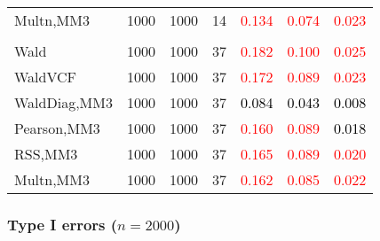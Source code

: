 \documentclass[
]{article}
\begin{document}
\begin{table}[H]
{\begin{tabular}[t]{lrrrrrr}
\hspace{1em}Multn,MM3 & 1000 & 1000 & 14 & \textcolor{red}{0.134} & \textcolor{red}{0.074} & \textcolor{red}{0.023}\\
\addlinespace[0.3em]
\multicolumn{7}{l}{\textbf{3F 15V}}\\
\hspace{1em}Wald & 1000 & 1000 & 37 & \textcolor{red}{0.182} & \textcolor{red}{0.100} & \textcolor{red}{0.025}\\
\hspace{1em}WaldVCF & 1000 & 1000 & 37 & \textcolor{red}{0.172} & \textcolor{red}{0.089} & \textcolor{red}{0.023}\\
\hspace{1em}WaldDiag,MM3 & 1000 & 1000 & 37 & \textcolor{black}{0.084} & \textcolor{black}{0.043} & \textcolor{black}{0.008}\\
\hspace{1em}Pearson,MM3 & 1000 & 1000 & 37 & \textcolor{red}{0.160} & \textcolor{red}{0.089} & \textcolor{black}{0.018}\\
\hspace{1em}RSS,MM3 & 1000 & 1000 & 37 & \textcolor{red}{0.165} & \textcolor{red}{0.089} & \textcolor{red}{0.020}\\
\hspace{1em}Multn,MM3 & 1000 & 1000 & 37 & \textcolor{red}{0.162} & \textcolor{red}{0.085} & \textcolor{red}{0.022}\\
\bottomrule
\end{tabular}}
\endgroup{}
\end{table}

\hypertarget{type-i-errors-n2000-3}{%
\subsubsection{\texorpdfstring{Type I errors
(\(n=2000\))}{Type I errors (n=2000)}}\label{type-i-errors-n2000-3}}
\end{document}
